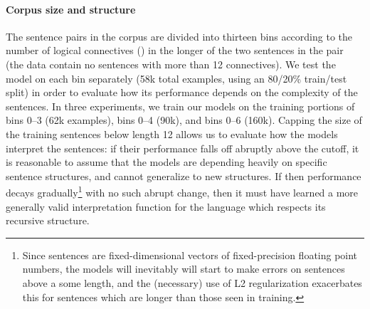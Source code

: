 \paragraph{Corpus size and structure}
The sentence pairs in the corpus are divided into thirteen bins according to the number of logical connectives () in the longer of the two sentences in the pair (the data contain no sentences with more than 12 connectives). We test the model on each bin separately (58k total examples, using an 80/20\% train/test split) in order to evaluate how its performance depends on the complexity of the sentences. In three experiments, we train our models on the training portions of bins 0--3 (62k examples), bins 0--4 (90k), and bins 0--6 (160k). Capping the size of the training sentences below length 12 allows us to evaluate how the models interpret the sentences: if their performance falls off abruptly above the cutoff, it is reasonable to assume that the models are depending heavily on specific sentence structures, and cannot generalize to new structures. If then performance decays gradually\footnote{Since sentences are fixed-dimensional vectors of fixed-precision floating point numbers, the models will inevitably will start to make errors on sentences above a some length, and the (necessary) use of L2 regularization exacerbates this for sentences which are longer than those seen in training.} with no such abrupt change, then it must have learned a more generally valid interpretation function for the language which respects its recursive structure.



